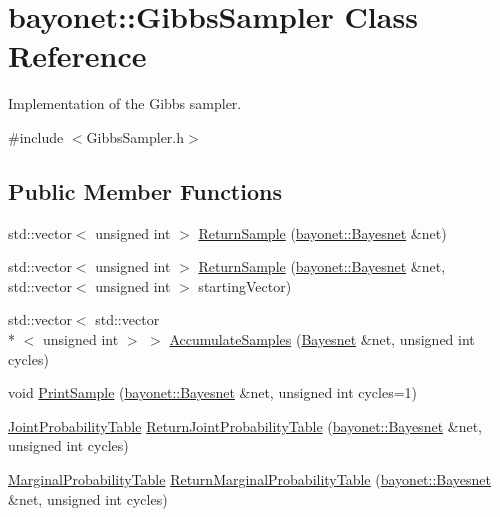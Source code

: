 \hypertarget{classbayonet_1_1_gibbs_sampler}{\section{bayonet\-:\-:Gibbs\-Sampler Class Reference}
\label{classbayonet_1_1_gibbs_sampler}
}


Implementation of the Gibbs sampler.  




{\ttfamily \#include $<$Gibbs\-Sampler.\-h$>$}

\subsection*{Public Member Functions}
\begin{DoxyCompactItemize}
\item 
std\-::vector$<$ unsigned int $>$ \hyperlink{classbayonet_1_1_gibbs_sampler_ac789fc64fd349769633ab84ea5e59f70}{Return\-Sample} (\hyperlink{classbayonet_1_1_bayesnet}{bayonet\-::\-Bayesnet} \&net)
\item 
std\-::vector$<$ unsigned int $>$ \hyperlink{classbayonet_1_1_gibbs_sampler_aa3e7d24f8eae4ee4c4ed0a2c16a9b5fa}{Return\-Sample} (\hyperlink{classbayonet_1_1_bayesnet}{bayonet\-::\-Bayesnet} \&net, std\-::vector$<$ unsigned int $>$ starting\-Vector)
\item 
std\-::vector$<$ std\-::vector\\*
$<$ unsigned int $>$ $>$ \hyperlink{classbayonet_1_1_gibbs_sampler_a625b16c10dc1d4fea3899fd5a0b3c921}{Accumulate\-Samples} (\hyperlink{classbayonet_1_1_bayesnet}{Bayesnet} \&net, unsigned int cycles)
\item 
void \hyperlink{classbayonet_1_1_gibbs_sampler_af375d044a2e0c45a384f37ee4761a2ba}{Print\-Sample} (\hyperlink{classbayonet_1_1_bayesnet}{bayonet\-::\-Bayesnet} \&net, unsigned int cycles=1)
\item 
\hyperlink{classbayonet_1_1_joint_probability_table}{Joint\-Probability\-Table} \hyperlink{classbayonet_1_1_gibbs_sampler_a29dfcfda3462de83fa89672768d690f4}{Return\-Joint\-Probability\-Table} (\hyperlink{classbayonet_1_1_bayesnet}{bayonet\-::\-Bayesnet} \&net, unsigned int cycles)
\item 
\hyperlink{classbayonet_1_1_marginal_probability_table}{Marginal\-Probability\-Table} \hyperlink{classbayonet_1_1_gibbs_sampler_aba99980c2695c9d5835a29b9fb04c6f3}{Return\-Marginal\-Probability\-Table} (\hyperlink{classbayonet_1_1_bayesnet}{bayonet\-::\-Bayesnet} \&net, unsigned int cycles)
\end{DoxyCompactItemize}


